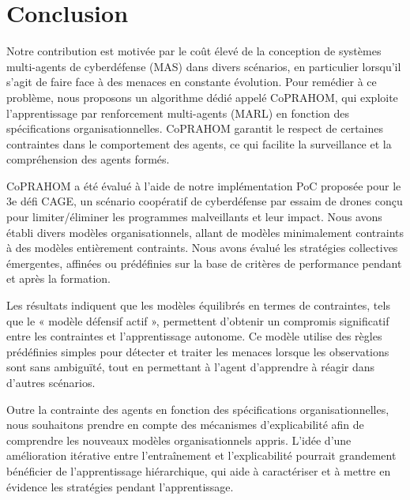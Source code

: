\section{Conclusion}\label{sec:conclusion}

Notre contribution est motivée par le coût élevé de la conception de systèmes multi-agents de cyberdéfense (MAS) dans divers scénarios, en particulier lorsqu'il s'agit de faire face à des menaces en constante évolution. Pour remédier à ce problème, nous proposons un algorithme dédié appelé CoPRAHOM, qui exploite l'apprentissage par renforcement multi-agents (MARL) en fonction des spécifications organisationnelles. CoPRAHOM garantit le respect de certaines contraintes dans le comportement des agents, ce qui facilite la surveillance et la compréhension des agents formés.

CoPRAHOM a été évalué à l'aide de notre implémentation PoC proposée pour le 3e défi CAGE, un scénario coopératif de cyberdéfense par essaim de drones conçu pour limiter/éliminer les programmes malveillants et leur impact. Nous avons établi divers modèles organisationnels, allant de modèles minimalement contraints à des modèles entièrement contraints. Nous avons évalué les stratégies collectives émergentes, affinées ou prédéfinies sur la base de critères de performance pendant et après la formation.

Les résultats indiquent que les modèles équilibrés en termes de contraintes, tels que le « modèle défensif actif », permettent d'obtenir un compromis significatif entre les contraintes et l'apprentissage autonome. Ce modèle utilise des règles prédéfinies simples pour détecter et traiter les menaces lorsque les observations sont sans ambiguïté, tout en permettant à l'agent d'apprendre à réagir dans d'autres scénarios.

Outre la contrainte des agents en fonction des spécifications organisationnelles, nous souhaitons prendre en compte des mécanismes d'explicabilité afin de comprendre les nouveaux modèles organisationnels appris. L'idée d'une amélioration itérative entre l'entraînement et l'explicabilité pourrait grandement bénéficier de l'apprentissage hiérarchique, qui aide à caractériser et à mettre en évidence les stratégies pendant l'apprentissage.


